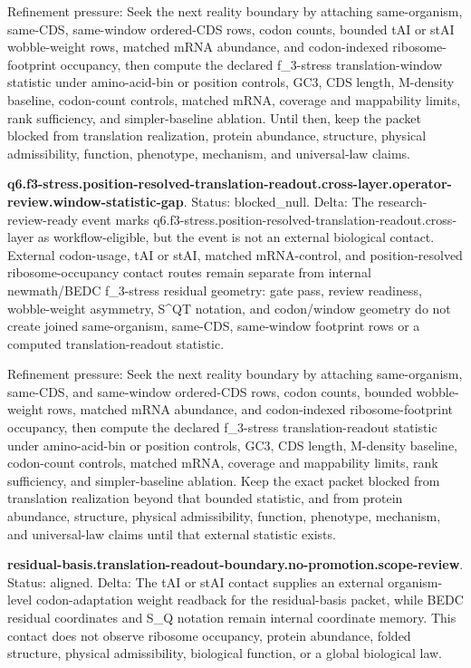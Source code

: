 Refinement pressure: Seek the next reality boundary by attaching same-organism, same-CDS, same-window ordered-CDS rows, codon counts, bounded tAI or stAI wobble-weight rows, matched mRNA abundance, and codon-indexed ribosome-footprint occupancy, then compute the declared f\_3-stress translation-window statistic under amino-acid-bin or position controls, GC3, CDS length, M-density baseline, codon-count controls, matched mRNA, coverage and mappability limits, rank sufficiency, and simpler-baseline ablation. Until then, keep the packet blocked from translation realization, protein abundance, structure, physical admissibility, function, phenotype, mechanism, and universal-law claims.

\textbf{q6.f3-stress.position-resolved-translation-readout.cross-layer.operator-review.window-statistic-gap}. Status: blocked\_null. Delta: The research-review-ready event marks q6.f3-stress.position-resolved-translation-readout.cross-layer as workflow-eligible, but the event is not an external biological contact. External codon-usage, tAI or stAI, matched mRNA-control, and position-resolved ribosome-occupancy contact routes remain separate from internal newmath/BEDC f\_3-stress residual geometry: gate pass, review readiness, wobble-weight asymmetry, S\textasciicircum{}QT notation, and codon/window geometry do not create joined same-organism, same-CDS, same-window footprint rows or a computed translation-readout statistic.

Refinement pressure: Seek the next reality boundary by attaching same-organism, same-CDS, and same-window ordered-CDS rows, codon counts, bounded wobble-weight rows, matched mRNA abundance, and codon-indexed ribosome-footprint occupancy, then compute the declared f\_3-stress translation-readout statistic under amino-acid-bin or position controls, GC3, CDS length, M-density baseline, codon-count controls, matched mRNA, coverage and mappability limits, rank sufficiency, and simpler-baseline ablation. Keep the exact packet blocked from translation realization beyond that bounded statistic, and from protein abundance, structure, physical admissibility, function, phenotype, mechanism, and universal-law claims until that external statistic exists.

\textbf{residual-basis.translation-readout-boundary.no-promotion.scope-review}. Status: aligned. Delta: The tAI or stAI contact supplies an external organism-level codon-adaptation weight readback for the residual-basis packet, while BEDC residual coordinates and S\_Q notation remain internal coordinate memory. This contact does not observe ribosome occupancy, protein abundance, folded structure, physical admissibility, biological function, or a global biological law.

